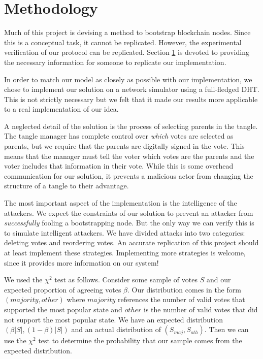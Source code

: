\section{Methodology}
\label{sec:methodology}


Much of this project is devising a method to bootstrap blockchain nodes.
Since this is a conceptual task, it cannot be replicated.
However, the experimental verification of our protocol can be replicated.
Section \ref{sec:methodology} is devoted to providing the necessary information for someone to replicate our implementation.


In order to match our model as closely as possible with our implementation, we chose to implement our solution on a network simulator using a full-fledged DHT.
This is not strictly necessary but we felt that it made our results more applicable to a real implementation of our idea.


A neglected detail of the solution is the process of selecting parents in the tangle.
The tangle manager has complete control over \textit{which} votes are selected as parents, but we require that the parents are digitally signed in the vote.
This means that the manager must tell the voter which votes are the parents and the voter includes that information in their vote.
While this is some overhead communication for our solution, it prevents a malicious actor from changing the structure of a tangle to their advantage.


The most important aspect of the implementation is the intelligence of the attackers.
We expect the constraints of our solution to prevent an attacker from \textit{successfully} fooling a bootstrapping node.
But the only way we can verify this is to simulate intelligent attackers.
We have divided attacks into two categories: deleting votes and reordering votes.
An accurate replication of this project should at least implement these strategies.
Implementing more strategies is welcome, since it provides more information on our system!


We used the $\chi ^2$ test as follows.
Consider some sample of votes $S$ and our expected proportion of agreeing votes $\beta$.
Our distribution comes in the form $(majority, other)$ where $majority$ references the number of valid votes that supported the most popular state and $other$ is the number of valid votes that did not support the most popular state.
We have an expected distribution $(\beta|S|, (1-\beta)|S|)$ and an actual distribution of $(S_{maj}, S_{oth})$.
Then we can use the $\chi ^2$ test to determine the probability that our sample comes from the expected distribution.


